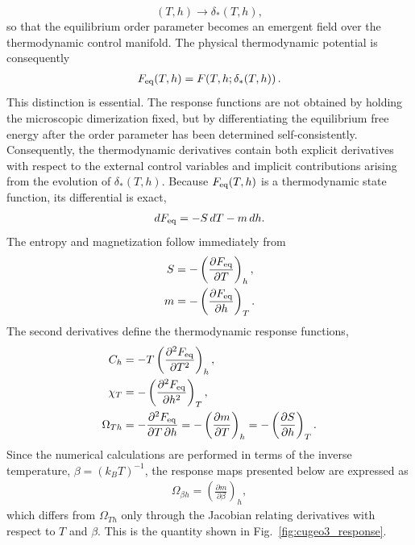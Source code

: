 \[
(T,h)
\longrightarrow
\delta_\ast(T,h),
\]
so that the equilibrium order parameter becomes an emergent
field over the thermodynamic control manifold.
The physical thermodynamic potential is consequently
\begin{align}
F_{\rm eq}(T,h)
=
F\!\left(T,h;\delta_\ast(T,h)\right).
\end{align}
This distinction is essential. The response functions are not
obtained by holding the microscopic dimerization fixed, but by
differentiating the equilibrium free energy after the order
parameter has been determined self-consistently. Consequently,
the thermodynamic derivatives contain both explicit derivatives
with respect to the external control variables and implicit
contributions arising from the evolution of
\(\delta_\ast(T,h)\).
Because \(F_{\rm eq}(T,h)\) is a thermodynamic state function,
its differential is exact,
\begin{align}
dF_{\rm eq}
=
-S\,dT
-
m\,dh.
\end{align}
The entropy and magnetization follow immediately from
\begin{align}
S
&=
-
\left(
\frac{\partial F_{\rm eq}}
{\partial T}
\right)_h,
\\
m
&=
-
\left(
\frac{\partial F_{\rm eq}}
{\partial h}
\right)_T.
\end{align}
The second derivatives define the thermodynamic response
functions,
\begin{align}
C_h
&= - T
\left(
\frac{\partial^2F_{\rm eq}}
{\partial T^2}
\right)_h,
\\
\chi_T
&=
-\left(
\frac{\partial^2F_{\rm eq}}
{\partial h^2}
\right)_T,
\\
\Omega_{Th}
&=
-
\frac{\partial^2F_{\rm eq}}
{\partial T\,\partial h}
=
-
\left(
\frac{\partial m}{\partial T}
\right)_h
=
-
\left(
\frac{\partial S}{\partial h}
\right)_T.
\end{align}
Since the numerical calculations are performed in terms of the
inverse temperature,
\(\beta=(k_BT)^{-1}\),
the response maps presented below are expressed as
\begin{align}
\Omega_{\beta h}
=
\left(
\frac{\partial m}
{\partial\beta}
\right)_h,
\end{align}
which differs from \(\Omega_{Th}\) only through the Jacobian
relating derivatives with respect to \(T\) and \(\beta\).
This is the quantity shown in
Fig.~\ref{fig:cugeo3_response}.

